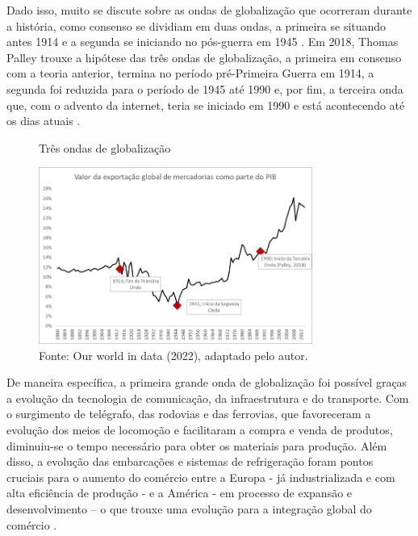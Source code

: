\documentclass[12pt]{article}
\begin{document}
Dado isso, muito se discute sobre as ondas de globalização que ocorreram durante a história, como consenso se dividiam em duas ondas, a primeira se situando antes 1914 e a segunda se iniciando no pós-guerra em 1945 \cite{krugman15}. Em 2018, Thomas Palley trouxe a hipótese das três ondas de globalização, a primeira em consenso com a teoria anterior, termina no período pré-Primeira Guerra em 1914, a segunda foi reduzida para o período de 1945 até 1990 e, por fim, a terceira onda que, com o advento da internet, teria se iniciado em 1990 e está acontecendo até os dias atuais \cite{palley2018three}. 


\begin{figure}[h]
    \begin{center}
        \caption{Três ondas de globalização}
        \includegraphics[width=0.8\textwidth]{globalização.png}
        \caption*{Fonte: Our world in data (2022), adaptado pelo autor.}
        \label{globalizacao}
    \end{center}
\end{figure}

De maneira específica, a primeira grande onda de globalização foi possível graças a evolução da tecnologia de comunicação, da infraestrutura e do transporte. Com o surgimento de telégrafo, das rodovias e das ferrovias, que favoreceram a evolução dos meios de locomoção e facilitaram a compra e venda de produtos, diminuiu-se o tempo necessário para obter os materiais para produção\cite{globalization18}. Além disso, a evolução das embarcações e sistemas de refrigeração foram pontos cruciais para o aumento do comércio entre a Europa - já industrializada e com alta eficiência de produção - e a América - em processo de expansão e desenvolvimento – o que trouxe uma evolução para a integração global do comércio \cite{palley2018three}. 
\end{document}
